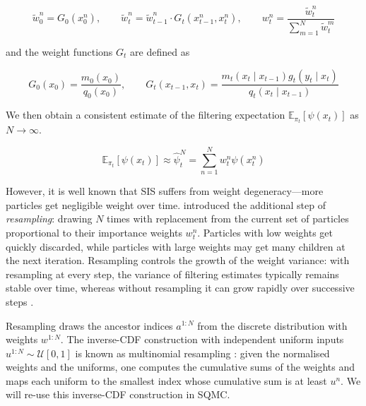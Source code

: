 \begin{equation*}
    \tilde{w}_0^n = G_0(x_0^n), \qquad \tilde{w}_t^n = \tilde{w}_{t-1}^n \cdot G_t(x_{t-1}^n, x_t^n), \qquad w_t^n = \frac{\tilde{w}_t^n}{\sum_{m=1}^N \tilde{w}_t^m}
\end{equation*}

and the weight functions $G_t$ are defined as 

\begin{equation*}
    G_0(x_0) = \frac{m_0(x_0)}{q_0(x_0)}, \qquad  G_t(x_{t-1}, x_t) = \frac{m_t(x_t \mid x_{t-1}) g_t(y_t \mid x_t)}{q_t(x_t \mid x_{t-1})}
\end{equation*}

We then obtain a consistent estimate of the filtering expectation $\mathbb{E}_{\pi_t}[\psi(x_t)]$ as $N \to \infty$.

\begin{equation*}
    \mathbb{E}_{\pi_t}[\psi(x_t)] \approx \hat{\psi}_t^N = \sum_{n=1}^N w_t^n \psi(x_t^n)
\end{equation*}

However, it is well known that SIS suffers from weight degeneracy---more particles get negligible weight over time. \citet{gordonsalmondsmith1993} introduced the additional step of \textit{resampling}: drawing $N$ times with replacement from the current set of particles proportional to their importance weights $w_t^n$. Particles with low weights get quickly discarded, while particles with large weights may get many children at the next iteration. Resampling controls the growth of the weight variance: with resampling at every step, the variance of filtering estimates typically remains stable over time, whereas without resampling it can grow rapidly over successive steps \citep{delmoralguionnet1999clt,chopinpapaspiliopoulos020introtosmc}.


Resampling draws the ancestor indices $a^{1:N}$ from the discrete distribution with weights $w^{1:N}$. The inverse-CDF construction with independent uniform inputs $u^{1:N} \sim \mathcal{U}[0,1]$ is known as multinomial resampling \citep[pg.~214]{devroye1986nonuniform}: given the normalised weights and the uniforms, one computes the cumulative sums of the weights and maps each uniform to the smallest index whose cumulative sum is at least $u^n$. We will re-use this inverse-CDF construction in SQMC.

